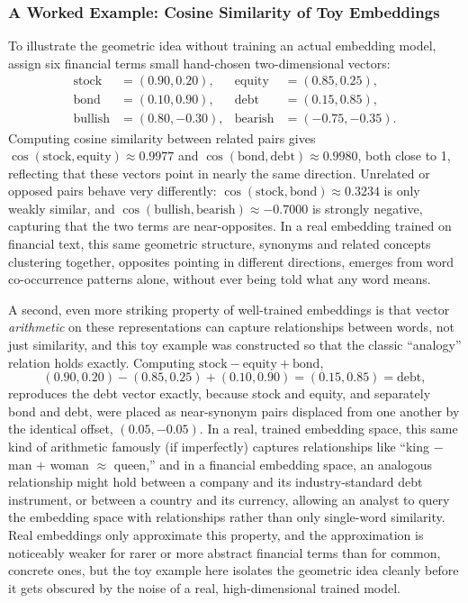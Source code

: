 \documentclass[../ai_in_finance]{subfiles}
\begin{document}
\subsubsection*{A Worked Example: Cosine Similarity of Toy Embeddings}

To illustrate the geometric idea without training an actual embedding model, assign six financial terms small hand-chosen two-dimensional vectors:
\begin{align*}
\text{stock} &= (0.90, 0.20), & \text{equity} &= (0.85, 0.25), \\
\text{bond} &= (0.10, 0.90), & \text{debt} &= (0.15, 0.85), \\
\text{bullish} &= (0.80, -0.30), & \text{bearish} &= (-0.75, -0.35).
\end{align*}
Computing cosine similarity between related pairs gives $\cos(\text{stock}, \text{equity}) \approx 0.9977$ and $\cos(\text{bond}, \text{debt}) \approx 0.9980$, both close to 1, reflecting that these vectors point in nearly the same direction. Unrelated or opposed pairs behave very differently: $\cos(\text{stock}, \text{bond}) \approx 0.3234$ is only weakly similar, and $\cos(\text{bullish}, \text{bearish}) \approx -0.7000$ is strongly negative, capturing that the two terms are near-opposites. In a real embedding trained on financial text, this same geometric structure, synonyms and related concepts clustering together, opposites pointing in different directions, emerges from word co-occurrence patterns alone, without ever being told what any word means.

A second, even more striking property of well-trained embeddings is that vector \emph{arithmetic} on these representations can capture relationships between words, not just similarity, and this toy example was constructed so that the classic ``analogy'' relation holds exactly. Computing $\text{stock} - \text{equity} + \text{bond}$,
\begin{equation*}
(0.90, 0.20) - (0.85, 0.25) + (0.10, 0.90) = (0.15, 0.85) = \text{debt},
\end{equation*}
reproduces the debt vector exactly, because stock and equity, and separately bond and debt, were placed as near-synonym pairs displaced from one another by the identical offset, $(0.05, -0.05)$. In a real, trained embedding space, this same kind of arithmetic famously (if imperfectly) captures relationships like ``king $-$ man $+$ woman $\approx$ queen,'' and in a financial embedding space, an analogous relationship might hold between a company and its industry-standard debt instrument, or between a country and its currency, allowing an analyst to query the embedding space with relationships rather than only single-word similarity. Real embeddings only approximate this property, and the approximation is noticeably weaker for rarer or more abstract financial terms than for common, concrete ones, but the toy example here isolates the geometric idea cleanly before it gets obscured by the noise of a real, high-dimensional trained model.
\end{document}
